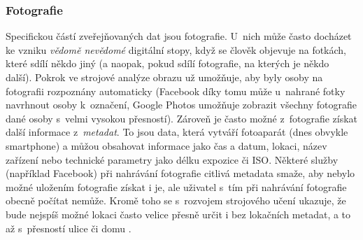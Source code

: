 \subsubsection*{Fotografie}
Specifickou částí zveřejňovaných dat jsou fotografie. U~nich může často docházet ke vzniku \textit{vědomě nevědomé} digitální stopy, když se člověk objevuje na fotkách, které sdílí někdo jiný (a naopak, pokud sdílí fotografie, na kterých je někdo další).
Pokrok ve strojové analýze obrazu už umožňuje, aby byly osoby na fotografii rozpoznány automaticky (Facebook díky tomu může u~nahrané fotky navrhnout osoby k~označení, Google Photos umožňuje zobrazit všechny fotografie dané osoby s~velmi vysokou přesností).
Zároveň je často možné z~fotografie získat další informace z~\textit{metadat}. To jsou data, která vytváří fotoaparát (dnes obvykle smartphone) a můžou obsahovat informace jako čas a datum, lokaci, název zařízení nebo technické parametry jako délku expozice či ISO. Některé služby (například Facebook) při nahrávání fotografie citlivá metadata smaže, aby nebylo možné uložením fotografie získat i je, ale uživatel s~tím při nahrávání fotografie obecně počítat nemůže.
Kromě toho se s~rozvojem strojového učení ukazuje, že bude nejspíš možné lokaci často velice přesně určit i bez lokačních metadat, a to až s~přesností ulice či domu \citep{ai-photo-location}.

